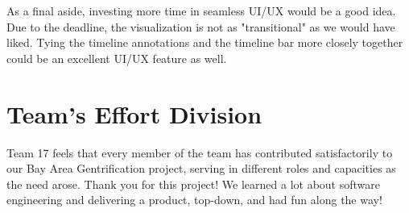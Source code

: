 \documentclass{article}
\begin{document}
    As a final aside, investing more time in seamless UI/UX would be a good idea. Due to the deadline, the visualization is not as "transitional" as we would have liked. Tying the timeline annotations and the timeline bar more closely together could be an excellent UI/UX feature as well. 
    
\section{Team's Effort Division}

Team 17 feels that every member of the team has contributed satisfactorily to our Bay Area Gentrification project, serving in different roles and capacities as the need arose. Thank you for this project! We learned a lot about software engineering and delivering a product, top-down, and had fun along the way!

\nocite{*}


\end{document}
